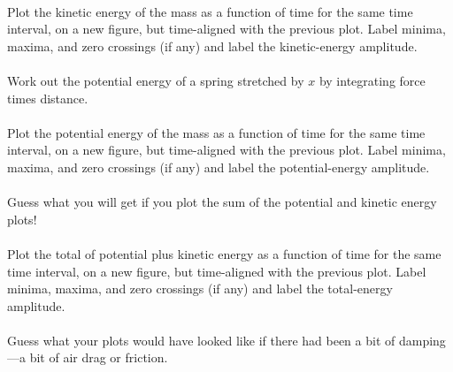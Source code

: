 \documentclass[12pt]{article}
\begin{document}
\paragraph{\theproblem}%
Plot the kinetic energy of the mass as a function of time for the same time
interval, on a new figure, but time-aligned with the previous plot.  Label
minima, maxima, and zero crossings (if any) and label the kinetic-energy amplitude.

\paragraph{\theproblem}%
Work out the potential energy of a spring stretched by $x$ by
integrating force times distance.

\paragraph{\theproblem}%
Plot the potential energy of the mass as a function of time for the same time
interval, on a new figure, but time-aligned with the previous plot.  Label
minima, maxima, and zero crossings (if any) and label the potential-energy amplitude.

\paragraph{\theproblem}%
Guess what you will get if you plot the sum of the potential and kinetic energy plots!

\paragraph{\theproblem}%
Plot the total of potential plus kinetic energy as a function of time for the same time
interval, on a new figure, but time-aligned with the previous plot.  Label
minima, maxima, and zero crossings (if any) and label the total-energy amplitude.

\paragraph{\theproblem}%
Guess what your plots would have looked like if there had been a bit of
damping---a bit of air drag or friction.
\end{document}
